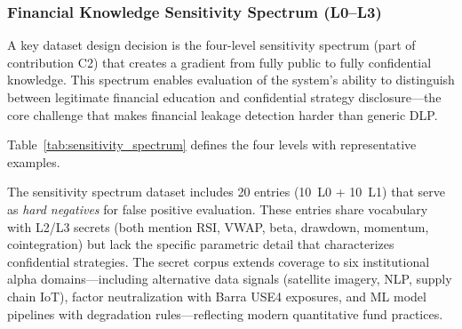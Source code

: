 \documentclass[journal]{IEEEtran}
\begin{document}
\subsubsection{Financial Knowledge Sensitivity Spectrum (L0--L3)}

A key dataset design decision is the four-level sensitivity spectrum (part of contribution C2) that creates a gradient from fully public to fully confidential knowledge. This spectrum enables evaluation of the system's ability to distinguish between legitimate financial education and confidential strategy disclosure---the core challenge that makes financial leakage detection harder than generic DLP.

Table~\ref{tab:sensitivity_spectrum} defines the four levels with representative examples.

\begin{table}[!ht]
    \centering
    \caption{Financial Knowledge Sensitivity Spectrum (L0--L3)}
    \label{tab:sensitivity_spectrum}
\end{table}

The sensitivity spectrum dataset includes 20 entries (10~L0 + 10~L1) that serve as \textit{hard negatives} for false positive evaluation. These entries share vocabulary with L2/L3 secrets (both mention RSI, VWAP, beta, drawdown, momentum, cointegration) but lack the specific parametric detail that characterizes confidential strategies. The secret corpus extends coverage to six institutional alpha domains---including alternative data signals (satellite imagery, NLP, supply chain IoT), factor neutralization with Barra USE4 exposures, and ML model pipelines with degradation rules---reflecting modern quantitative fund practices.
\end{document}
